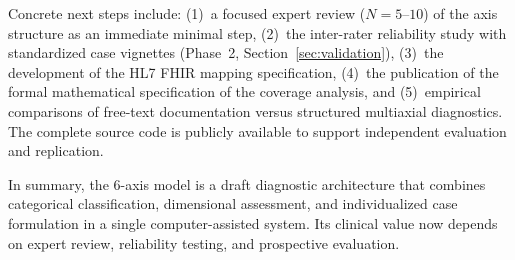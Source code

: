 \documentclass[11pt,a4paper]{article}
\begin{document}
Concrete next steps include: (1)~a focused expert review ($N = 5$--$10$) of the axis structure as an immediate minimal step, (2)~the inter-rater reliability study with standardized case vignettes (Phase~2, Section~\ref{sec:validation}), (3)~the development of the HL7 FHIR mapping specification, (4)~the publication of the formal mathematical specification of the coverage analysis, and (5)~empirical comparisons of free-text documentation versus structured multiaxial diagnostics. The complete source code is publicly available to support independent evaluation and replication.

In summary, the 6-axis model is a draft diagnostic architecture that combines categorical classification, dimensional assessment, and individualized case formulation in a single computer-assisted system. Its clinical value now depends on expert review, reliability testing, and prospective evaluation.
\end{document}
